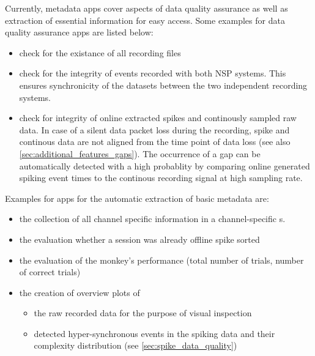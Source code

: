 Currently, metadata apps cover aspects of data quality assurance as well as extraction of essential information for easy access. Some examples for data quality assurance apps are listed below:
\begin{itemize}
 \item check for the existance of all recording files
 \item check for the integrity of events recorded with both NSP systems. This ensures synchronicity of the datasets between the two independent  recording systems.
 \item check for integrity of online extracted spikes and continously sampled raw data. In case of a silent data packet loss during the recording, spike and continous data are not aligned from the time point of data loss (see also \cref{sec:additional_features_gaps}). The occurrence of a gap can be automatically detected with a high probablity by comparing online generated spiking event times to the continous recording signal at high sampling rate.
\end{itemize}

Examples for apps for the automatic extraction of basic metadata are:
\begin{itemize}
  \setlength{\itemsep}{0pt}
  \setlength{\parskip}{0pt}
  \setlength{\parsep}{0pt}
 \item the collection of all channel specific information in a channel-specific  s.
 \item the evaluation whether a session was already offline spike sorted
 \item the evaluation of the monkey's performance (total number of trials, number of correct trials)
 \item the creation of overview plots of 
 \begin{itemize}
  \setlength\itemsep{0pt}
  \setlength{\parskip}{0pt}
  \setlength{\parsep}{0pt}
  \item the raw recorded data for the purpose of visual inspection
  \item detected hyper-synchronous events in the spiking data and their complexity distribution (see \cref{sec:spike_data_quality})
 \end{itemize}
\end{itemize}

